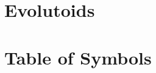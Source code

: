 \documentclass{amsart}
\begin{document}
\section{Evolutoids}

\label{app:general-evolutoids}


\section{Table of Symbols}

\label{app:symbols}
\newpage



%
\end{document}
